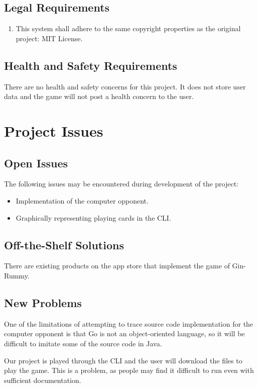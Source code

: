 \documentclass[12pt, titlepage]{article}
\begin{document}
\subsection{Legal Requirements}
\begin{enumerate}[{L}.1]
    \item This system shall adhere to the same copyright properties as the original project: MIT License.
\end{enumerate}

\subsection{Health and Safety Requirements}
There are no health and safety concerns for this project. It does not store user data and the game will not post a health concern to the user.

\section{Project Issues}
\subsection{Open Issues}
The following issues may be encountered during development of the project:
\begin{itemize}
    \item Implementation of the computer opponent.
    \item Graphically representing playing cards in the CLI.
\end{itemize}

\subsection{Off-the-Shelf Solutions}
There are existing products on the app store that implement the game of Gin-Rummy. 

\subsection{New Problems}
One of the limitations of attempting to trace source code implementation for the computer opponent is that Go is not an object-oriented language, so it will be difficult to imitate some of the source code in Java.

Our project is played through the CLI and the user will download the files to play the game. This is a problem, as people may find it difficult to run even with sufficient documentation. 
\end{document}
